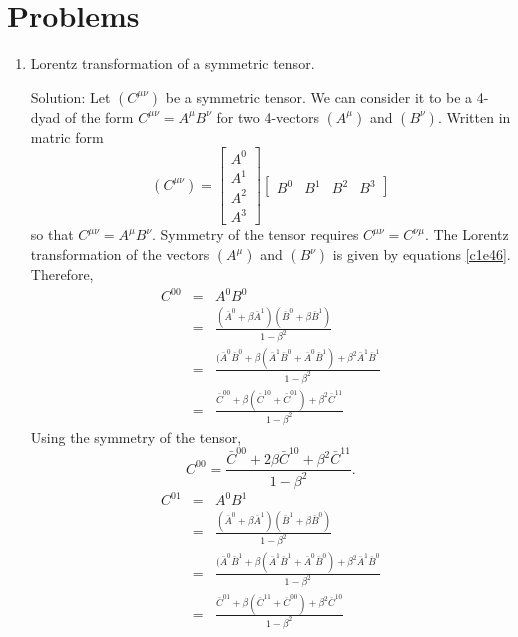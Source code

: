 \section{Problems}
\begin{enumerate}
\item Lorentz transformation of a symmetric tensor. 
\item[Solution:] Let $(C^{\mu\nu})$ be a symmetric tensor. We can consider it to
be a 4-dyad of the form $C^{\mu\nu} = A^\mu B^\nu$ for two 4-vectors $(A^\mu)$ 
and $(B^\nu)$. Written in matric form
\begin{equation}\label{c1e87}
(C^{\mu\nu}) = \begin{bmatrix}A^0 \\ A^1 \\ A^2 \\ A^3\end{bmatrix}
\begin{bmatrix}B^0 & B^1 & B^2 & B^3 \end{bmatrix}
\end{equation}
so that $C^{\mu\nu} = A^\mu B^\nu$. Symmetry of the tensor requires $C^{\mu\nu}
= C^{\nu\mu}$. The Lorentz transformation of the vectors $(A^\mu)$ and $(B^\nu)$
is given by equations \eqref{c1e46}. Therefore,
\begin{eqnarray*}
C^{00} &=& A^0 B^0 \\
 &=& \frac{(\bar{A}^0 + \beta\bar{A}^1)(\bar{B}^0 + \beta\bar{B}^1)}{1 - \beta^2} \\
 &=& \frac{(\bar{A}^0\bar{B}^0 + \beta(\bar{A}^1\bar{B}^0 + \bar{A}^0\bar{B}^1) + \beta^2\bar{A}^1\bar{B}^1}{1 - \beta^2} \\
 &=& \frac{\bar{C}^{00} + \beta(\bar{C}^{10} + \bar{C}^{01}) + \beta^2\bar{C}^{11}}{1 - \beta^2}
\end{eqnarray*}
Using the symmetry of the tensor,
\begin{equation}\label{c1e88}
C^{00} = \frac{\bar{C}^{00} + 2\beta\bar{C}^{10} + \beta^2\bar{C}^{11}}{1 - \beta^2}.
\end{equation}
\begin{eqnarray*}
C^{01} &=& A^0 B^1 \\
 &=& \frac{(\bar{A}^0 + \beta\bar{A}^1)(\bar{B}^1 + \beta\bar{B}^0)}{1 - \beta^2} \\
 &=& \frac{(\bar{A}^0\bar{B}^1 + \beta(\bar{A}^1\bar{B}^1 + \bar{A}^0\bar{B}^0) + \beta^2\bar{A}^1\bar{B}^0}{1 - \beta^2} \\
 &=& \frac{\bar{C}^{01} + \beta(\bar{C}^{11} + \bar{C}^{00}) + \beta^2\bar{C}^{10}}{1 - \beta^2}

\end{eqnarray*}
\end{enumerate}
